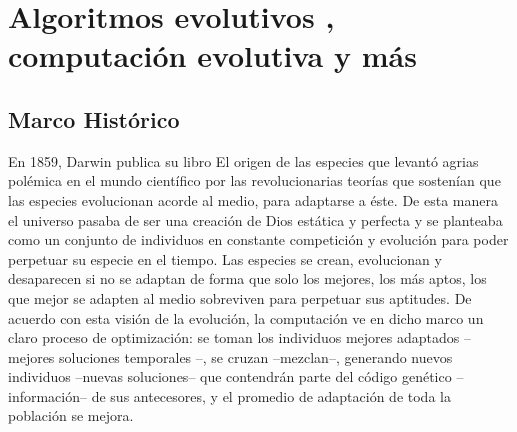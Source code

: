 \documentclass{article}
\begin{document}
   


\section{Algoritmos evolutivos , computación evolutiva y más}

\subsection*{Marco Hist\'orico}

En 1859, Darwin publica su libro El origen de las especies que levantó agrias
polémica en el mundo científico por las revolucionarias teorías que sostenían que las
especies evolucionan acorde al medio, para adaptarse a éste.
De esta manera el universo pasaba de ser una creación de Dios estática y perfecta y
se planteaba como un conjunto de individuos en constante competición y evolución para
poder perpetuar su especie en el tiempo. Las especies se crean, evolucionan y
desaparecen si no se adaptan de forma que solo los mejores, los más aptos, los que
mejor se adapten al medio sobreviven para perpetuar sus aptitudes. 
De acuerdo con esta visión de la evolución, la computación ve en dicho marco un
claro proceso de optimización: se toman los individuos mejores adaptados –mejores
soluciones temporales –, se cruzan –mezclan–, generando nuevos individuos –nuevas
soluciones– que contendrán parte del código genético –información– de sus antecesores,
y el promedio de adaptación de toda la población se mejora.
\end{document}
